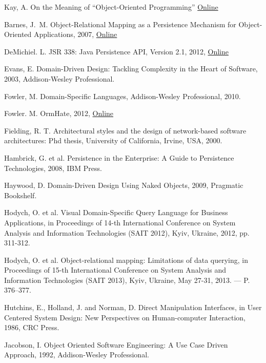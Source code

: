 \documentclass[a4paper,12pt,oneside,openright,final]{memoir} %
\begin{document}
%
%
\begin{thebibliography}{5}

Kay, A. On the Meaning of ``Object-Oriented Programming''
\href{http://www.purl.org/stefan_ram/pub/doc_kay_oop_en}{Online}

Bar\-nes, J.~M. Object-Relational Mapping as a Persistence Mechanism for Object-Oriented Applications, 2007,
\href{http://digitalcommons.macalester.edu/mathcs_honors/6/}{Online}

De\-Mi\-chiel. L. JSR 338: Java Persistence API, Version 2.1, 2012,
\href{http://jcp.org/aboutJava/communityprocess/pr/jsr338/index.html}{Online}

Evans, E. Domain-Driven Design: Tackling Complexity in the Heart of Software, 2003, Addison-Wesley Professional.

Fow\-ler, M. Domain-Specific Languages, Addison-Wesley Professional, 2010.

Fow\-ler. M. OrmHate, 2012,
\href{http://martinfowler.com/bliki/OrmHate.html}{Online}

Fielding, R. T. Architectural styles and the design of network-based software architectures: Phd thesis, University of California, Irvine, USA, 2000.

Hambrick, G. et al. Persistence in the Enterprise: A Guide to Persistence Technologies, 2008, IBM Press.

Haywood, D. Domain-Driven Design Using Naked Objects, 2009, Pragmatic Bookshelf.

Hodych, O. et al. Visual Domain-Specific Query Language for Business Applications, in Proceedings of 14-th International Conference on System Analysis and Information Technologies (SAIT 2012), Kyiv, Ukraine, 2012, pp. 311-312.

Hodych, O. et al. Object-relational mapping: Limitations of data querying, in Proceedings of 15-th International Conference on System Analysis and Information Technologies (SAIT 2013), Kyiv, Ukraine, May 27-31, 2013. — P. 376–377.

Hutchins, E., Holland, J. and Norman, D. Direct Manipulation Interfaces, in User Centered System Design: New Perspectives on Human-computer Interaction, 1986, CRC Press.

Jacobson, I. Object Oriented Software Engineering: A Use Case Driven Approach, 1992, Addison-Wesley Professional.


\end{thebibliography}
\end{document}
